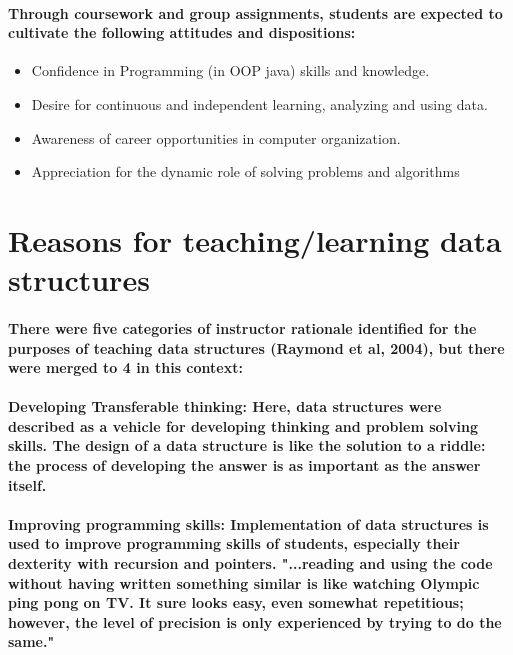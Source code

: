 \documentclass{article}
\begin{document}
\paragraph{Through coursework and group assignments, students are expected to cultivate the following attitudes and dispositions: } 
\begin{itemize}
    \item \cite{bennedsen2004programming}Confidence in Programming (in OOP java) skills and knowledge.

    \item Desire for continuous and independent learning, analyzing and using data.
    \item Awareness of career opportunities in computer organization.

    \item \cite{trinkle1997dynamic}Appreciation for the dynamic role of solving problems and algorithms


\end{itemize}
\section{Reasons for teaching/learning data structures}
\paragraph{There were five categories of instructor rationale identified for the\cite{lister2004dimensions} purposes of teaching data structures (Raymond et al, 2004), but there were merged to 4 in this context:}

\paragraph{Developing Transferable thinking: Here, data structures were described as a vehicle for developing thinking and problem solving skills. The design of a data structure is like the solution to a riddle: the process of developing the answer is as important as the answer itself.}

\paragraph{Improving programming skills: \cite{blank2012folk}Implementation of data structures is used to improve programming skills of students, especially their dexterity with recursion and pointers. "...reading and using the code without having written something similar is like watching Olympic ping pong on TV. It sure looks easy, even somewhat repetitious; however, the level of precision is only experienced by trying to do the same." }
\end{document}
